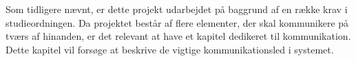 Som tidligere nævnt, er dette projekt udarbejdet på baggrund af en række krav i studieordningen.
Da projektet består af flere elementer, der skal kommunikere på tværs af hinanden, er det relevant at have et kapitel dedikeret til kommunikation.
Dette kapitel vil forsøge at beskrive de vigtige kommunikationsled i systemet.